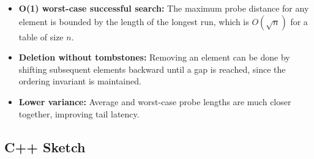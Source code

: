 \begin{itemize}
\item \textbf{O(1) worst-case successful search:} The maximum probe distance for any element is bounded by the length of the longest run, which is $O(\sqrt{n})$ for a table of size $n$.
\item \textbf{Deletion without tombstones:} Removing an element can be done by shifting subsequent elements backward until a gap is reached, since the ordering invariant is maintained.
\item \textbf{Lower variance:} Average and worst-case probe lengths are much closer together, improving tail latency.
\end{itemize}

\subsection{C++ Sketch}

